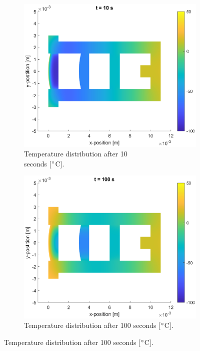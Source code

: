 \documentclass[a4paper,11pt]{article}
\begin{document}
\begin{figure}[H]
    \centering
    \begin{subfigure}{0.45\linewidth}{
        \centering
        \includegraphics[width=1\linewidth]{bND1.eps}
        \caption{Temperature distribution after 10\\seconds [$\degree$C].}
        \label{sub:ND1}
    }\end{subfigure}
    \begin{subfigure}{0.45\linewidth}{
        \centering
        \includegraphics[width=1\linewidth]{bND2.eps}
        \caption{Temperature distribution after 100 seconds [$\degree$C].}
        \label{sub:ND2}
    }\end{subfigure}

\end{figure}
\end{document}
